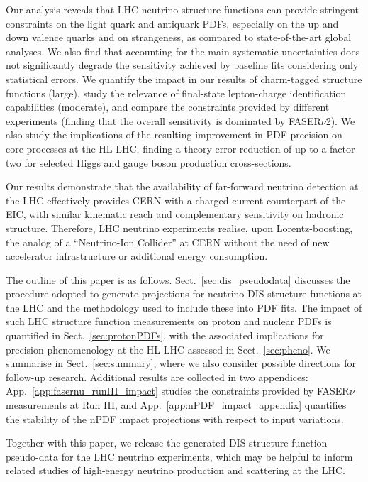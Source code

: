 Our analysis reveals that  LHC neutrino structure functions can provide  stringent constraints
on the light quark and antiquark PDFs, especially on the up and down
valence quarks and on strangeness, as compared to state-of-the-art global analyses.
%
We also  find that accounting for the main systematic uncertainties does not significantly
degrade the sensitivity achieved by baseline fits considering only statistical errors.
%
We quantify the impact in our results of charm-tagged structure functions (large), study the relevance
of final-state lepton-charge identification capabilities (moderate), and compare the constraints
provided by different experiments (finding that the overall sensitivity is dominated by FASER$\nu$2).
%
We also study the implications of the resulting improvement in PDF precision
on core processes at the HL-LHC, finding a theory error reduction
of up to a factor two for selected  Higgs and gauge boson production
cross-sections. 

Our results demonstrate that the availability of far-forward neutrino detection
at the LHC effectively
provides CERN with a charged-current counterpart of the EIC,
with similar kinematic reach and complementary sensitivity on hadronic
structure.
%
Therefore, LHC neutrino experiments realise, upon Lorentz-boosting, the analog of
a ``Neutrino-Ion Collider'' at CERN
without the need of new accelerator infrastructure or additional energy consumption.

The outline of this paper is as follows.
%
Sect.~\ref{sec:dis_pseudodata} discusses the procedure
adopted to generate projections for neutrino DIS structure functions at the LHC
and the methodology used to include these into PDF fits.
%
The impact of such LHC structure function measurements on proton and nuclear
PDFs is quantified in Sect.~\ref{sec:protonPDFs}, with the
associated implications for precision phenomenology
at the HL-LHC assessed in Sect.~\ref{sec:pheno}.
%
We summarise in Sect.~\ref{sec:summary}, where we also consider possible
directions for follow-up research.
%
Additional results are collected in two appendices:
App.~\ref{app:fasernu_runIII_impact} studies the constraints provided by
FASER$\nu$ measurements at Run III, and App.~\ref{app:nPDF_impact_appendix}
quantifies the stability of the nPDF impact projections with respect
to input variations.

Together with this paper,
we release the generated  DIS structure function pseudo-data for the LHC
neutrino experiments, which may be helpful
to inform related studies of high-energy
neutrino production and scattering at the LHC.



